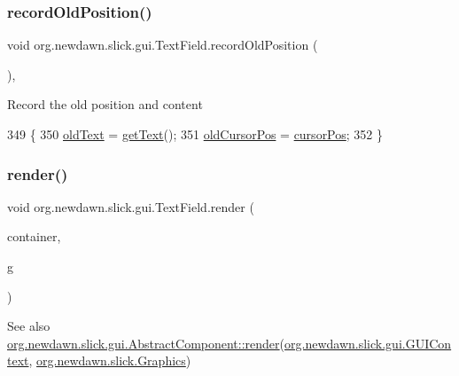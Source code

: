 \subsubsection{\texorpdfstring{record\+Old\+Position()}{recordOldPosition()}}
{\footnotesize\ttfamily void org.\+newdawn.\+slick.\+gui.\+Text\+Field.\+record\+Old\+Position (\begin{DoxyParamCaption}{ }\end{DoxyParamCaption})\hspace{0.3cm}{\ttfamily [inline]}, {\ttfamily [protected]}}

Record the old position and content 
\begin{DoxyCode}
349                                        \{
350         \mbox{\hyperlink{classorg_1_1newdawn_1_1slick_1_1gui_1_1_text_field_a9f52b9f250dde2673cc5063348508375}{oldText}} = \mbox{\hyperlink{classorg_1_1newdawn_1_1slick_1_1gui_1_1_text_field_a81258ba3259b7edb6cdbca7727909305}{getText}}();
351         \mbox{\hyperlink{classorg_1_1newdawn_1_1slick_1_1gui_1_1_text_field_aeb272b81f1df084f3c001e91aac5ca37}{oldCursorPos}} = \mbox{\hyperlink{classorg_1_1newdawn_1_1slick_1_1gui_1_1_text_field_a05994000bb672a1f49a9a8ee30ced3e5}{cursorPos}};
352     \}
\end{DoxyCode}
\mbox{\label{classorg_1_1newdawn_1_1slick_1_1gui_1_1_text_field_ab0ccda30370e0b9b27cf398c38fc5b83}} 
\subsubsection{\texorpdfstring{render()}{render()}}
{\footnotesize\ttfamily void org.\+newdawn.\+slick.\+gui.\+Text\+Field.\+render (\begin{DoxyParamCaption}\item[{\mbox{\hyperlink{interfaceorg_1_1newdawn_1_1slick_1_1gui_1_1_g_u_i_context}{G\+U\+I\+Context}}}]{container,  }\item[{\mbox{\hyperlink{classorg_1_1newdawn_1_1slick_1_1_graphics}{Graphics}}}]{g }\end{DoxyParamCaption})\hspace{0.3cm}{\ttfamily [inline]}}

\begin{DoxySeeAlso}{See also}
\mbox{\hyperlink{classorg_1_1newdawn_1_1slick_1_1gui_1_1_abstract_component_af2f66829fb28f1c9f27acfc6f1be2445}{org.\+newdawn.\+slick.\+gui.\+Abstract\+Component\+::render}}(\mbox{\hyperlink{interfaceorg_1_1newdawn_1_1slick_1_1gui_1_1_g_u_i_context}{org.\+newdawn.\+slick.\+gui.\+G\+U\+I\+Context}}, \mbox{\hyperlink{classorg_1_1newdawn_1_1slick_1_1_graphics}{org.\+newdawn.\+slick.\+Graphics}}) 
\end{DoxySeeAlso}

